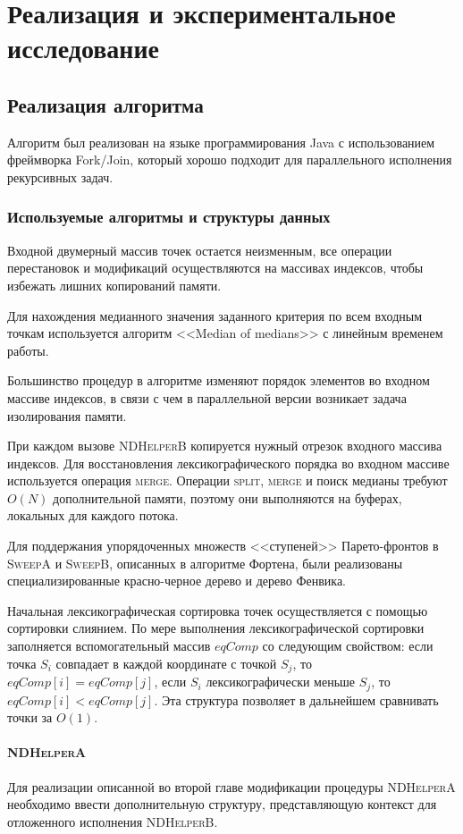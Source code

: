 \chapter{Реализация и экспериментальное исследование}
\section{Реализация алгоритма}
Алгоритм был реализован на языке программирования Java с использованием фреймворка Fork/Join, который хорошо подходит для параллельного исполнения рекурсивных задач.

\subsection{Используемые алгоритмы и структуры данных}
Входной двумерный массив точек остается неизменным, все операции перестановок и модификаций осуществляются на массивах индексов, чтобы избежать лишних копирований памяти.

Для нахождения медианного значения заданного критерия по всем входным точкам используется алгоритм <<Median of medians>> с линейным временем работы.

Большинство процедур в алгоритме изменяют порядок элементов во входном массиве индексов, в связи с чем в параллельной версии возникает задача изолирования памяти.

При каждом вызове \textsc{NDHelperB} копируется нужный отрезок входного массива индексов.
Для восстановления лексикографического порядка во входном массиве используется операция \textsc{merge}.
Операции \textsc{split}, \textsc{merge} и поиск медианы требуют $O(N)$ дополнительной памяти, поэтому они выполняются на буферах, локальных для каждого потока.

Для поддержания упорядоченных множеств <<ступеней>> Парето-фронтов в \textsc{SweepA} и \textsc{SweepB}, описанных в алгоритме Фортена, были реализованы специализированные красно-черное дерево и дерево Фенвика.

Начальная лексикографическая сортировка точек осуществляется с помощью сортировки слиянием.
По мере выполнения лексикографической сортировки заполняется вспомогательный массив $eqComp$ со следующим свойством: если точка $S_i$ совпадает в каждой координате с точкой $S_j$, то $eqComp[i] = eqComp[j]$, если $S_i$ лексикографически меньше $S_j$, то $eqComp[i] < eqComp[j]$.
Эта структура позволяет в дальнейшем сравнивать точки за $O(1)$.

\subsubsection{\textsc{NDHelperA}}
Для реализации описанной во второй главе модификации процедуры \textsc{NDHelperA} необходимо ввести дополнительную структуру, представляющую контекст для отложенного исполнения \textsc{NDHelperB}.

